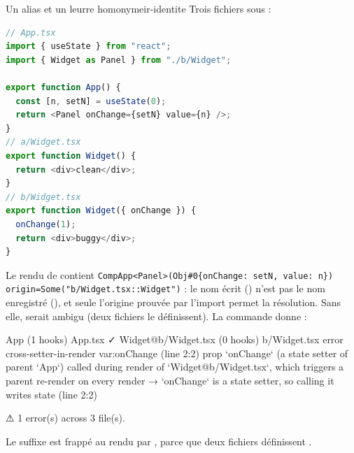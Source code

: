 \begin{exemple}{Un alias et un leurre homonyme}{ir-identite}
Trois fichiers sous  :
\begin{lstlisting}[language=TypeScript]
// App.tsx
import { useState } from "react";
import { Widget as Panel } from "./b/Widget";

export function App() {
  const [n, setN] = useState(0);
  return <Panel onChange={setN} value={n} />;
}
// a/Widget.tsx
export function Widget() {
  return <div>clean</div>;
}
// b/Widget.tsx
export function Widget({ onChange }) {
  onChange(1);
  return <div>buggy</div>;
}
\end{lstlisting}
Le rendu de  contient \texttt{CompApp<Panel>(Obj\#0\{onChange: setN, value: n\}) origin=Some("b/Widget.tsx::Widget")} : le nom écrit () n'est pas le nom enregistré (), et seule l'origine prouvée par l'import permet la résolution. Sans elle,  serait ambigu (deux fichiers le définissent). La commande  donne :
\begin{sortie}
  App  (1 hooks)  App.tsx  ✓
  Widget@b/Widget.tsx  (0 hooks)  b/Widget.tsx
    error  cross-setter-in-render  var:onChange  (line 2:2)  prop `onChange` (a state setter of parent `App`) called during render of `Widget@b/Widget.tsx`, which triggers a parent re-render on every render
       → `onChange` is a state setter, so calling it writes state (line 2:2)

⚠  1 error(s) across 3 file(s).
\end{sortie}
Le suffixe  est frappé au rendu par , parce que deux fichiers définissent .
\end{exemple}

